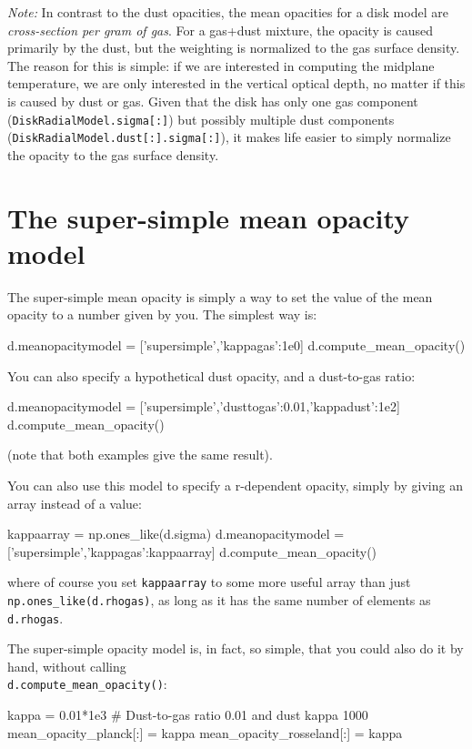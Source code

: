 \documentclass{book}
\newcommand{\code}[1]{{\small\tt #1}}
\begin{document}
{\em Note:} In contrast to the dust opacities, the mean opacities for a disk
model are {\em cross-section per gram of gas}. For a gas+dust mixture, the
opacity is caused primarily by the dust, but the weighting is normalized to the
gas surface density. The reason for this is simple: if we are interested in
computing the midplane temperature, we are only interested in the vertical
optical depth, no matter if this is caused by dust or gas. Given that the disk
has only one gas component (\code{DiskRadialModel.sigma[:]}) but possibly multiple
dust components (\code{DiskRadialModel.dust[:].sigma[:]}), it makes life easier to
simply normalize the opacity to the gas surface density.


\section{The super-simple mean opacity model}
\label{sec-mean-opac-supersimple}
%
The super-simple mean opacity is simply a way to set the value of the mean
opacity to a number given by you. The simplest way is:
\begin{codebox}
d.meanopacitymodel = ['supersimple',{'kappagas':1e0}]
d.compute_mean_opacity()
\end{codebox}
You can also specify a hypothetical dust opacity, and a dust-to-gas
ratio:
\begin{codebox}
d.meanopacitymodel = ['supersimple',{'dusttogas':0.01,'kappadust':1e2}]
d.compute_mean_opacity()
\end{codebox}
(note that both examples give the same result).

You can also use this model to specify a r-dependent opacity,
simply by giving an array instead of a value:
\begin{codebox}
kappaarray         = np.ones_like(d.sigma)
d.meanopacitymodel = ['supersimple',{'kappagas':kappaarray}]
d.compute_mean_opacity()
\end{codebox}
where of course you set \code{kappaarray} to some more useful
array than just \code{np.ones\_like(d.rhogas)}, as long as it
has the same number of elements as \code{d.rhogas}.

The super-simple opacity model is, in fact, so simple, that you
could also do it by hand, without calling\\ \code{d.compute\_mean\_opacity()}:
\begin{codebox}
kappa = 0.01*1e3    # Dust-to-gas ratio 0.01 and dust kappa 1000
mean_opacity_planck[:] = kappa
mean_opacity_rosseland[:] = kappa
\end{codebox}
\end{document}

